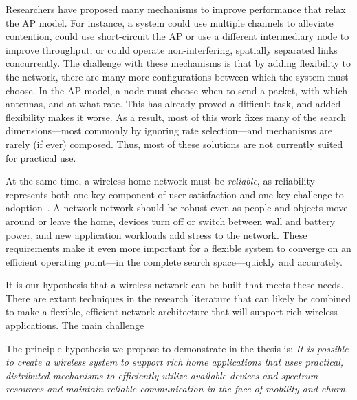 Researchers have proposed many mechanisms to improve performance that relax the AP model. For instance, a system could use multiple channels to alleviate contention, could use short-circuit the AP or use a different intermediary node to improve throughput, or could operate non-interfering, spatially separated links concurrently. The challenge with these mechanisms is that by adding flexibility to the network, there are many more configurations between which the system must choose. In the AP model, a node must choose when to send a packet, with which antennas, and at what rate. This has already proved a difficult task, and added flexibility makes it worse. As a result, most of this work fixes many of the search dimensions---most commonly by ignoring rate selection---and mechanisms are rarely (if ever) composed. Thus, most of these solutions are not currently suited for practical use.

At the same time, a wireless home network must be \emph{reliable}, as reliability represents both one key component of user satisfaction and one key challenge to adoption~\cite{edwards_challenges}. A network network should be robust even as people and objects move around or leave the home, devices turn off or switch between wall and battery power, and new application workloads add stress to the network. These requirements make it even more important for a flexible system to converge on an efficient operating point---in the complete search space---quickly and accurately.

It is our hypothesis that a wireless network can be built that meets these needs. There are extant techniques in the research literature that can likely be combined to make a flexible, efficient network architecture that will support rich wireless applications. The main challenge


The principle hypothesis we propose to demonstrate in the thesis is: \emph{It is possible to create a wireless system to support rich home applications that uses practical, distributed mechanisms to efficiently utilize available devices and spectrum resources and maintain reliable communication in the face of mobility and churn.}

